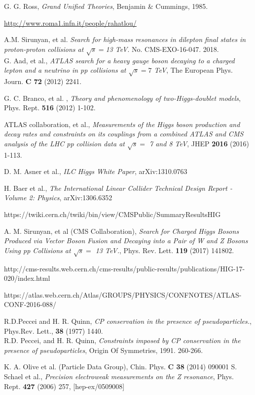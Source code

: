 \documentclass{cernyrep}
\begin{document}
\begin{thebibliography}{100}
G. G. Ross,
{\em Grand Unified Theories}, Benjamin \& Cummings, 1985.

\url{http://www.roma1.infn.it/people/rahatlou/}

A.M. Sirunyan, et al. {\it Search for high-mass resonances in dilepton final states in proton-proton collisions at $\sqrt {s}= $13 TeV}. No. CMS-EXO-16-047. 2018.\\
G. Aad, et al., {\it ATLAS search for a heavy gauge boson decaying to a charged lepton and a neutrino in pp collisions at $\sqrt {s}= 7$ TeV}, The European Phys. Journ.  {\bf C 72} (2012) 2241.

G. C. Branco, et al. , {\it Theory and phenomenology of two-Higgs-doublet models}, Phys. Rept.  {\bf 516}  (2012) 1-102.

ATLAS collaboration, et al., {\it Measurements of the Higgs boson production and decay
rates and constraints on its couplings
from a combined ATLAS and CMS analysis of
the LHC pp collision data at $\sqrt{s} =$ 7 and 8 TeV},  JHEP {\bf 2016} (2016) 1-113.

D. M. Asner et al., \emph{ILC Higgs White Paper}, arXiv:1310.0763

H. Baer et al., {\it The International Linear Collider Technical Design Report - Volume
2: Physics}, arXiv:1306.6352

https://twiki.cern.ch/twiki/bin/view/CMSPublic/SummaryResultsHIG

A. M. Sirunyan,  et al (CMS Collaboration), {\it Search for Charged Higgs Bosons Produced via Vector Boson Fusion and Decaying into a Pair of W and Z Bosons Using pp Collisions at $\sqrt{s} = $ 13 TeV.},  Phys. Rev. Lett. {\bf 119} (2017) 141802.

http://cms-results.web.cern.ch/cms-results/public-results/publications/HIG-17-020/index.html

https://atlas.web.cern.ch/Atlas/GROUPS/PHYSICS/CONFNOTES/ATLAS-CONF-2016-088/


R.D.Peccei  and H. R. Quinn, {\it CP conservation in the presence of pseudoparticles.}, Phys.Rev. Lett., {\bf 38} (1977) 1440.\\
R.D. Peccei, and H. R. Quinn, {\it Constraints imposed by CP conservation in the presence of pseudoparticles}, Origin Of Symmetries, 1991. 260-266.

K. A. Olive et al. (Particle Data Group), Chin. Phys. {\bf C 38} (2014) 090001
S. Schael et al., \emph{Precision electroweak measurements on the Z resonance}, Phys. Rept. {\bf 427} (2006) 257, [hep-ex/0509008]


\end{thebibliography}
\end{document}
